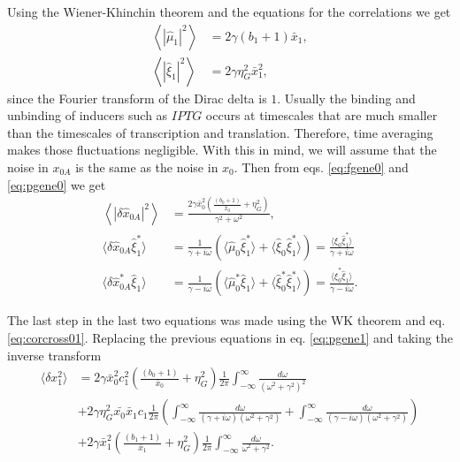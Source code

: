 Using the Wiener-Khinchin theorem and the equations for the correlations we get
\begin{align*}
  \left\langle|\hat{\mu}_1|^2\right\rangle &= 2\gamma(b_1+1)\bar{x}_1,\\
  \left\langle|\hat{\xi}_1|^2\right\rangle &= 2\gamma\eta_G^2\bar{x}_1^2,
\end{align*}
since the Fourier transform of the Dirac delta is $1$. Usually the binding and unbinding of inducers such as $IPTG$ occurs at timescales that are much smaller than the timescales of transcription and translation. Therefore, time averaging makes those fluctuations negligible. With this in mind, we will assume that the noise in $x_{0A}$ is the same as the noise in $x_0$. Then from eqs. \eqref{eq:fgene0} and \eqref{eq:pgene0} we get
\begin{align*}
\left\langle|\delta \hat{x}_{0A}|^2\right\rangle &= \frac{2\gamma\bar{x}_0^2\left(\frac{(b_0+1)}{\bar{x}_0}+ \eta_G^2\right)}{\gamma^2+\omega^2},\\
\langle\delta \hat{x}_{0A}\hat{\xi}_1^*\rangle &= \frac{1}{\gamma+i\omega}\left(\langle\hat{\mu}_0\hat{\xi}_1^*\rangle + \langle\hat{\xi}_0\hat{\xi}_1^*\rangle \right) = \frac{\langle\hat{\xi}_0\hat{\xi}_1^*\rangle}{\gamma+i\omega}\\
\langle\delta \hat{x}_{0A}^*\hat{\xi}_1\rangle &= \frac{1}{\gamma-i\omega}\left(\langle\hat{\mu}_0^*\hat{\xi}_1\rangle + \langle\hat{\xi}_0^*\hat{\xi}_1^*\rangle \right) = \frac{\langle\hat{\xi}_0^*\hat{\xi}_1\rangle}{\gamma-i\omega}.
\end{align*}

The last step in the last two equations was made using the WK theorem and eq. \eqref{eq:corcross01}. Replacing the previous equations in eq. \eqref{eq:pgene1} and taking the inverse transform
\begin{equation*}
  \begin{split}
    \langle \delta x_1^2\rangle &= 2\gamma\bar{x}_0^2c_1^2\left(\frac{(b_0+1)}{\bar{x}_0}+ \eta_G^2\right)\frac{1}{2\pi}\int_{-\infty}^{\infty}\frac{d\omega}{(\omega^2+\gamma^2)^2}\\
    &+2\gamma\eta_G^2\bar{x_0}\bar{x}_1c_1\frac{1}{2\pi}\left(\int_{-\infty}^{\infty}\frac{d\omega}{(\gamma + i\omega)(\omega^2+\gamma^2)} + \int_{-\infty}^{\infty}\frac{d\omega}{(\gamma - i\omega)(\omega^2+\gamma^2)}\right)\\
    &+2\gamma\bar{x}_1^2 \left(\frac{(b_1+1)}{\bar{x}_1}+\eta_G^2\right)\frac{1}{2\pi}\int_{-\infty}^{\infty}\frac{d\omega}{\omega^2+\gamma^2}.
  \end{split}
\end{equation*} 

